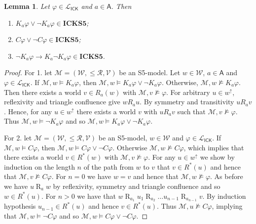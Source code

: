 \documentclass{myifcolog}
\newcommand\C {C}
\newcommand{\K}{K}
\newcommand\A{\mathsf{A}}
\newcommand{\agi}{a}
\newcommand{\ICK}{\mathsf{ICK}}
\newcommand{\LICK}{\mathcal{L}_{\ICK}}
\newcommand{\fw}{\mathcal{M}}
\newcommand{\Rel}{\mathrel{R}}
\newcommand{\W}{\mathcal{W}}
\newcommand{\rel}{\mathcal{R}}
\newcommand{\V}{\mathcal{V}}
\newtheorem{lemma}[theorem]{Lemma}
\numberwithin{theorem}{section}
\begin{document}
\begin{lemma}\label{c: classical truth conditions for implications}
    Let $\varphi \in \LICK$ and $\agi \in \A$. Then
    \begin{enumerate}
        \item $ \K_\agi \varphi \vee \neg \K_\agi \varphi \in \mathbf{ICKS5}$;
        \item $\C \varphi \vee \neg \C \varphi \in \mathbf{ICKS5}$;
        \item $ \neg \K_\agi \varphi \rightarrow \K_\agi \neg \K_\agi \varphi \in \mathbf{ICKS5}$.
    \end{enumerate}
\end{lemma}
\begin{proof}
    For 1. let $\fw=(\W, \leq \rel, \V)$ be an S5-model. Let $w \in \W$, $\agi \in \A$ and $\varphi \in \LICK$. If $\fw,w \models K_\agi \varphi$, then $\fw, w \models K_\agi \varphi \vee \neg K_\agi \varphi$. Otherwise, $\fw,w \not \models \K_\agi \varphi$. Then there exists a world $v \in R_\agi(w)$ with $\fw, v \not \models \varphi$. For arbitrary $u \in w^\uparrow$, reflexivity and triangle confluence give $w \mathrel{R_\agi} u$. By symmetry and transitivity $u \mathrel{R_\agi} v$. Hence, for any $u \in w^\uparrow$ there exists a world $v$ with $u \mathrel{R_\agi} v$ such that $\fw,v \not \models \varphi$. Thus $\fw,w \models \neg \K_\agi \varphi$ and so $\fw, w \models \K_\agi \varphi \vee \neg \K_\agi \varphi$. \smallskip
 
    \noindent For 2. let $\fw=(\W, \leq \rel, \V)$ be an S5-model, $w \in \W$ and $\varphi \in \LICK$. If $\fw, w \models \C \varphi$, then $\fw, w \models \C \varphi \vee \neg \C \varphi$. Otherwise $\fw, w \not \models \C \varphi$, which implies that there exists a world $v \in R^*(w)$ with $\fw, v \not \models \varphi$. For any $u \in w^\uparrow$ we show by induction on the length $n$ of the path from $w$ to $v$ that $v \in R^*(u)$ and hence that $\fw, v \not \models \C \varphi$. For $n=0$ we have $w = v$ and hence that $\fw, w \not \models \varphi$. As before we have $u \Rel_\agi w$ by reflexivity, symmetry and triangle confluence and so $w \in R^*(u)$. For $n > 0$ we have that $w \Rel_{\agi_1} u_1 \Rel_{\agi_2} \ldots u_{n-1} \Rel_{\agi_{n-1}} v$. By induction hypothesis $u_{n-1} \in R^*(u)$ and hence $v \in R^*(u)$. Thus $\fw, u \not \models \C \varphi$, implying that $\fw, w \models \neg \C \varphi$ and so $\fw, w \models \C \varphi \vee \neg \C \varphi$. \smallskip


\end{proof}
\end{document}
